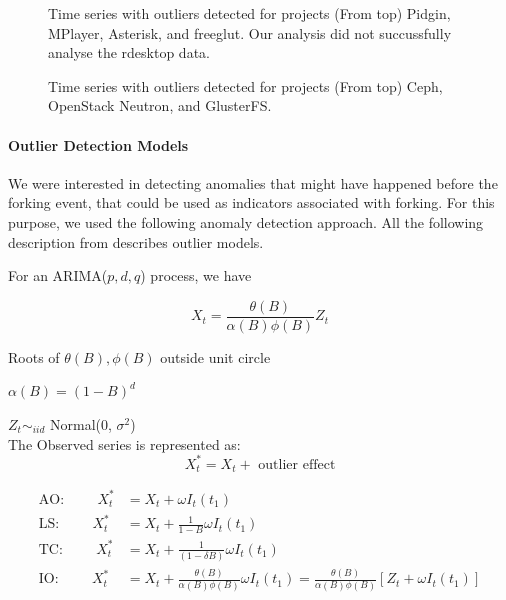 \documentclass[12pt]{report}
\begin{document}
\begin{figure}[!htbp]
\centering
{}

\caption{Time series with outliers detected for projects (From top) Pidgin, MPlayer, Asterisk, and freeglut. Our analysis did not succussfully analyse the rdesktop data.}
\label{figureOutliers_5to8}
\end{figure}


\begin{figure}[!htbp]
\centering

\caption{Time series with outliers detected for projects (From top) Ceph, OpenStack Neutron, and GlusterFS.}
\label{figureOutliers_9to12}
\end{figure}

\paragraph{Outlier Detection Models}

We were interested in detecting anomalies that might have happened before the forking event, that could be used as indicators associated with forking. For this purpose, we used the following anomaly detection approach. All the following description from \cite{Chen} describes outlier models. 

For an ARIMA($p, d, q$) process, we have 

\begin{equation}
X_t = \frac{\theta(B)}{\alpha(B) \phi(B)} Z_t 
\end{equation}

Roots of $\theta(B), \phi(B)$ outside unit circle

$\alpha(B) = (1 - B)^d$

$Z_t \sim_{iid}$ Normal(0, $\sigma^2$) \\

The Observed series is represented as:
\begin{equation}
X^*_t = X_t + \text{ outlier effect}
\end{equation}

\begin{align}
\text{AO:}\hspace{1cm}X^*_t &= X_t + \omega I_t(t_1) \\
\text{LS:}\hspace{1cm}X^*_t &= X_t + \frac{1}{1 - B} \omega I_t(t_1) \\
\text{TC:}\hspace{1cm}X^*_t &= X_t + \frac{1}{(1 - \delta B)} \omega I_t(t_1) \\
\text{IO:}\hspace{1cm}X^*_t &= X_t + \frac{\theta(B)}{\alpha(B) \phi(B)} \omega I_t(t_1) = \frac{\theta(B)}{\alpha(B) \phi(B)}\left[Z_t + \omega I_t(t_1)\right]
\end{align}
\end{document}
